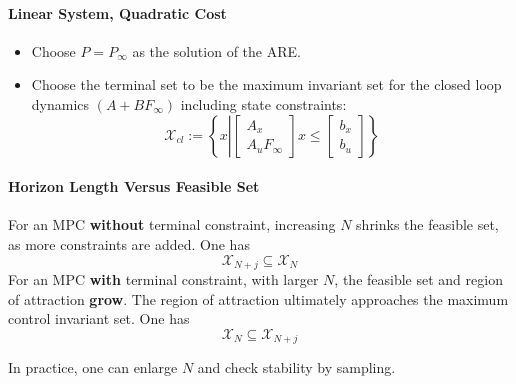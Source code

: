 \paragraph{Linear System, Quadratic Cost}
\begin{itemize}
    \item Choose $P=P_\infty$ as the solution of the ARE.
    \item Choose the terminal set to be the maximum invariant set for the closed loop dynamics $(A+BF_\infty)$ including state constraints:
          \begin{equation*}
              \mathcal{X}_{cl} := \left\{x \left|
              \begin{bmatrix}
                  A_x \\ A_u F_\infty
              \end{bmatrix}
              x \leq
              \begin{bmatrix}
                  b_x \\
                  b_u
              \end{bmatrix}\right.\right\}
          \end{equation*}
\end{itemize}

\paragraph{Horizon Length Versus Feasible Set}

For an MPC \textbf{without} terminal constraint, increasing $N$ shrinks the feasible set, as more constraints are added. One has
\begin{equation*}
    \mathcal{X}_{N+j} \subseteq \mathcal{X}_N
\end{equation*}
\newpar{}
For an MPC \textbf{with} terminal constraint, with larger $N$, the feasible set and region of attraction \textbf{grow}. The region of attraction ultimately approaches the maximum control invariant set. One has
\begin{equation*}
    \mathcal{X}_{N} \subseteq \mathcal{X}_{N+j}
\end{equation*}


In practice, one can enlarge $N$ and check stability by sampling.